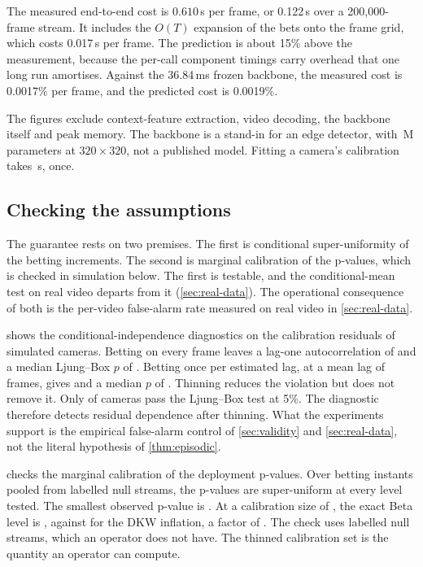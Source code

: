 The measured end-to-end cost is $0.610$\,\textmu s per frame, or 0.122\,s over a
200,000-frame stream. It includes the $O(T)$ expansion of the bets onto the
frame grid, which costs 0.017\,\textmu s per frame. The prediction is about 15\%
above the measurement, because the per-call component timings carry overhead
that one long run amortises. Against the 36.84\,ms frozen backbone, the measured
cost is 0.0017\% per frame, and the predicted cost is 0.0019\%.

The figures exclude context-feature extraction, video decoding, the backbone
itself and peak memory. The backbone is a stand-in for an edge detector, with
\CostBackboneParams{}\,M parameters at $320\times320$, not a published model.
Fitting a camera's calibration takes \CostFitSec{}\,s, once.

\subsection{Checking the assumptions}
\label{sec:diagnostics}


The guarantee rests on two premises. The first is conditional super-uniformity of
the betting increments. The second is marginal calibration of the p-values, which is checked in simulation
below. The first is testable, and the conditional-mean test on real video departs from it (\cref{sec:real-data}). The operational consequence of both is the
per-video false-alarm rate measured on real video in \cref{sec:real-data}.

 shows the conditional-independence diagnostics on the
calibration residuals of \DiagStreams{} simulated cameras. Betting on every frame leaves a
lag-one autocorrelation of \DiagAcfRaw{} and a median Ljung--Box $p$ of
\DiagLjungRaw. Betting once per estimated lag, at a mean lag of \DiagLagMean{}
frames, gives \DiagAcfThin{} and a median $p$ of \DiagLjungThin{}. Thinning reduces
the violation but does not remove it. Only \DiagLjungFrac{} of cameras pass the
Ljung--Box test at 5\%. The diagnostic therefore detects residual dependence after thinning. What the experiments support is the empirical false-alarm control of
\cref{sec:validity} and \cref{sec:real-data}, not the literal hypothesis of
\cref{thm:episodic}.

 checks the marginal calibration of the deployment p-values.
Over \DiagPN{} betting instants pooled from labelled null streams, the p-values
are super-uniform at every level tested. The smallest observed p-value is
\DiagPmin{}. At a calibration size of \CalN{}, the exact Beta level is
\BetaPmin{}, against \DkwPmin{} for the DKW inflation, a factor of
\BetaOverDkwSpeedup{}. The check uses labelled null streams, which an operator
does not have. The thinned calibration set is the quantity an operator can compute.

